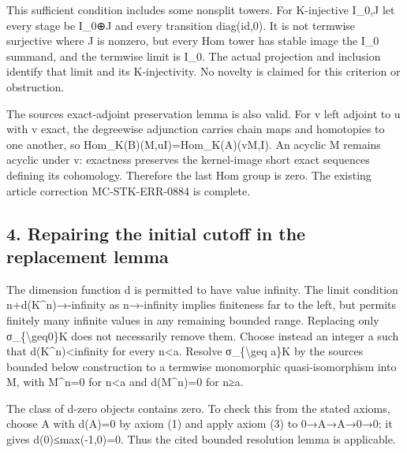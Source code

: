 \documentclass[11pt]{article}
\begin{document}
This sufficient condition includes some nonsplit towers. For K-injective I\_\allowbreak{}0,\allowbreak{}J let every stage be I\_\allowbreak{}0\allowbreak{}⊕J and every transition diag(id,\allowbreak{}0)\allowbreak{}. It is not termwise surjective where J is nonzero,\allowbreak{} but every Hom tower has stable image the I\_\allowbreak{}0 summand,\allowbreak{} and the termwise limit is I\_\allowbreak{}0. The actual projection and inclusion identify that limit and its K-injectivity. No novelty is claimed for this criterion or obstruction.

The source\textquotesingle s exact-adjoint preservation lemma is also valid. For v left adjoint to u with v exact,\allowbreak{} the degreewise adjunction carries chain maps and homotopies to one another,\allowbreak{} so Hom\_\allowbreak{}K(B)\allowbreak{}(M,\allowbreak{}uI)\allowbreak{}\allowbreak{}=Hom\_\allowbreak{}K(A)\allowbreak{}(vM,\allowbreak{}I)\allowbreak{}. An acyclic M remains acyclic under v:\allowbreak{} exactness preserves the kernel-image short exact sequences defining its cohomology. Therefore the last Hom group is zero. The existing article correction MC-STK-ERR-0884 is complete.

\subsection{4. Repairing the initial cutoff in the replacement lemma}\label{proofs-9746-10132-repairing-the-initial-cutoff-in-the-replacement-lemma}

The dimension function d is permitted to have value infinity. The limit condition n\allowbreak{}+d(K\textasciicircum{}n)\allowbreak{}\allowbreak{}→-infinity as n\allowbreak{}→-infinity implies finiteness far to the left,\allowbreak{} but permits finitely many infinite values in any remaining bounded range. Replacing only σ\_\allowbreak{}\{\textbackslash{}geq0\}K does not necessarily remove them. Choose instead an integer a such that d(K\textasciicircum{}n)\allowbreak{}<infinity for every n\textless a. Resolve σ\_\allowbreak{}\{\textbackslash{}geq a\}K by the source\textquotesingle s bounded below construction to a termwise monomorphic quasi-isomorphism into M,\allowbreak{} with M\textasciicircum{}n\allowbreak{}=0 for n\textless a and d(M\textasciicircum{}n)\allowbreak{}\allowbreak{}=0 for n≥a.

The class of d-zero objects contains zero. To check this from the stated axioms,\allowbreak{} choose A with d(A)\allowbreak{}\allowbreak{}=0 by axiom (1)\allowbreak{} and apply axiom (3)\allowbreak{} to 0\allowbreak{}→A\allowbreak{}→A\allowbreak{}→0\allowbreak{}→0; it gives d(0)\allowbreak{}≤max(-1,\allowbreak{}0)\allowbreak{}\allowbreak{}=0. Thus the cited bounded resolution lemma is applicable.
\end{document}
